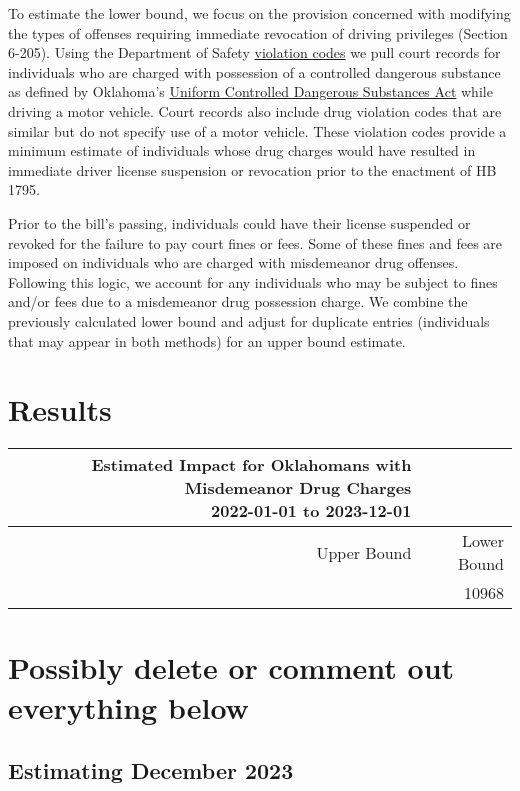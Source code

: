 \documentclass[
  letterpaper,
  DIV=11,
  numbers=noendperiod]{scrartcl}
\begin{document}
To estimate the lower bound, we focus on the provision concerned with
modifying the types of offenses requiring immediate revocation of
driving privileges (Section 6-205). Using the Department of Safety
\href{https://oklahoma.gov/content/dam/ok/en/dps/VCB\%20February\%202022.pdf}{violation
codes} we pull court records for individuals who are charged with
possession of a controlled dangerous substance as defined by Oklahoma's
\href{http://www.oklegislature.gov/cf_pdf/2003-04\%20INT/hb/HB2166\%20int.pdf}{Uniform
Controlled Dangerous Substances Act} while driving a motor vehicle.
Court records also include drug violation codes that are similar but do
not specify use of a motor vehicle. These violation codes provide a
minimum estimate of individuals whose drug charges would have resulted
in immediate driver license suspension or revocation prior to the
enactment of HB 1795.

Prior to the bill's passing, individuals could have their license
suspended or revoked for the failure to pay court fines or fees. Some of
these fines and fees are imposed on individuals who are charged with
misdemeanor drug offenses. Following this logic, we account for any
individuals who may be subject to fines and/or fees due to a misdemeanor
drug possession charge. We combine the previously calculated lower bound
and adjust for duplicate entries (individuals that may appear in both
methods) for an upper bound estimate.

\section{Results}\label{results}

\begingroup
\fontsize{12.0pt}{14.4pt}\selectfont
\begin{longtable*}{rr}
\caption*{
{\large Estimated Impact for Oklahomans with Misdemeanor Drug Charges} \\ 
{\small 2022-01-01 to 2023-12-01}
} \\ 
\toprule
Upper Bound & Lower Bound \\ 
\midrule{} & {10968} \\ 
\bottomrule
\end{longtable*}
\endgroup

\section{Possibly delete or comment out everything
below}\label{possibly-delete-or-comment-out-everything-below}

\subsection{Estimating December 2023}\label{estimating-december-2023}
\end{document}
